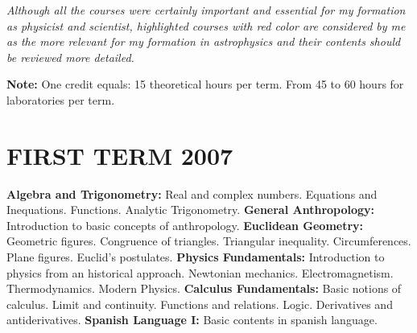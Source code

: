 \documentclass[10pt,a4paper]{moderncv}
\begin{document}
\vspace{1.0cm}
\maketitle

\textit{Although all the courses were certainly important and essential for my formation as 
physicist and scientist, highlighted courses with red color are considered by me as the more relevant 
for my formation in astrophysics and their contents should be reviewed more detailed.}

\vspace{1.0cm}

\footnotesize{\textbf{Note:} One credit equals: 15 theoretical hours per term. From 45 to 60 hours for 
laboratories per term.}

\normalsize
\section{\textsc{FIRST TERM 2007}}

	{ \textbf{Algebra and Trigonometry:} Real and complex numbers. Equations and Inequations. 
	Functions. Analytic Trigonometry. }
	{ \textbf{General Anthropology:} Introduction to basic concepts of anthropology. }
	{ \textbf{Euclidean Geometry:} Geometric figures. Congruence of triangles. Triangular inequality. 
	Circumferences. Plane figures. Euclid's postulates. }
	{ \textbf{Physics Fundamentals:} Introduction to physics from an historical approach. Newtonian 
	mechanics. Electromagnetism. Thermodynamics. Modern Physics. }
	{ \textbf{Calculus Fundamentals:} Basic notions of calculus. Limit and continuity. Functions 
	and relations. Logic. Derivatives and antiderivatives. }
	{ \textbf{Spanish Language I:} Basic contents in spanish language. }

\vspace{0.5cm}


\end{document}

